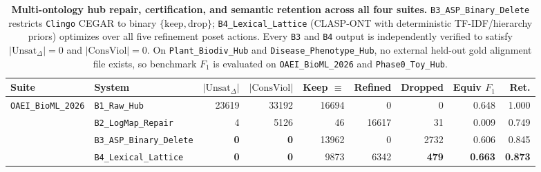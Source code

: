 \documentclass[10pt]{article}
\theoremstyle{accentdef}
\newcommand{\ClaspOAEIBioMLBRawHubUnsat}{23619}
\newcommand{\ClaspOAEIBioMLBRawHubConsViol}{33192}
\newcommand{\ClaspOAEIBioMLBRawHubRetention}{1.000}
\newcommand{\ClaspOAEIBioMLBRawHubEquivFone}{0.648}
\newcommand{\ClaspOAEIBioMLBRawHubKeepEquiv}{16694}
\newcommand{\ClaspOAEIBioMLBRawHubDropped}{0}
\newcommand{\ClaspOAEIBioMLBLogMapRepairUnsat}{4}
\newcommand{\ClaspOAEIBioMLBLogMapRepairConsViol}{5126}
\newcommand{\ClaspOAEIBioMLBLogMapRepairRetention}{0.749}
\newcommand{\ClaspOAEIBioMLBLogMapRepairEquivFone}{0.009}
\newcommand{\ClaspOAEIBioMLBLogMapRepairKeepEquiv}{46}
\newcommand{\ClaspOAEIBioMLBLogMapRepairDropped}{31}
\newcommand{\ClaspOAEIBioMLBASPBinaryDeleteUnsat}{0}
\newcommand{\ClaspOAEIBioMLBASPBinaryDeleteConsViol}{0}
\newcommand{\ClaspOAEIBioMLBASPBinaryDeleteRetention}{0.845}
\newcommand{\ClaspOAEIBioMLBASPBinaryDeleteEquivFone}{0.606}
\newcommand{\ClaspOAEIBioMLBASPBinaryDeleteKeepEquiv}{13962}
\newcommand{\ClaspOAEIBioMLBASPBinaryDeleteDropped}{2732}
\newcommand{\ClaspOAEIBioMLBLexicalLatticeUnsat}{0}
\newcommand{\ClaspOAEIBioMLBLexicalLatticeConsViol}{0}
\newcommand{\ClaspOAEIBioMLBLexicalLatticeRetention}{0.873}
\newcommand{\ClaspOAEIBioMLBLexicalLatticeEquivFone}{0.663}
\newcommand{\ClaspOAEIBioMLBLexicalLatticeKeepEquiv}{9873}
\newcommand{\ClaspOAEIBioMLBLexicalLatticeDropped}{479}
\begin{document}
\begin{table}[t]
\centering
\caption{\textbf{Multi-ontology hub repair, certification, and semantic retention across all four suites.} \texttt{B3\_ASP\_Binary\_Delete} restricts \texttt{Clingo} CEGAR to binary $\{\text{keep}, \text{drop}\}$; \texttt{B4\_Lexical\_Lattice} (\textsc{CLASP-ONT} with deterministic TF-IDF/hierarchy priors) optimizes over all five refinement poset actions. Every \texttt{B3} and \texttt{B4} output is independently verified to satisfy $|\mathrm{Unsat}_{\Delta}| = 0$ and $|\mathrm{ConsViol}| = 0$. On \texttt{Plant\_Biodiv\_Hub} and \texttt{Disease\_Phenotype\_Hub}, no external held-out gold alignment file exists, so benchmark $F_1$ is evaluated on \texttt{OAEI\_BioML\_2026} and \texttt{Phase0\_Toy\_Hub}.}
\label{tab:main_benchmark}
\footnotesize
\setlength{\tabcolsep}{4.2pt}
\begin{tabularx}{\textwidth}{@{}lXrrrrrrr@{}}
\toprule
\textbf{Suite} & \textbf{System} & $|\mathrm{Unsat}_{\Delta}|$ & $|\mathrm{ConsViol}|$ & \textbf{Keep $\equiv$} & \textbf{Refined} & \textbf{Dropped} & \textbf{Equiv $F_1$} & \textbf{Ret.} \\
\midrule
\multirow{4}{*}{\texttt{OAEI\_BioML\_2026}}
 & \texttt{B1\_Raw\_Hub} & \num{\ClaspOAEIBioMLBRawHubUnsat} & \num{\ClaspOAEIBioMLBRawHubConsViol} & \num{\ClaspOAEIBioMLBRawHubKeepEquiv} & 0 & \num{\ClaspOAEIBioMLBRawHubDropped} & \ClaspOAEIBioMLBRawHubEquivFone{} & \ClaspOAEIBioMLBRawHubRetention{} \\
 & \texttt{B2\_LogMap\_Repair} & \num{\ClaspOAEIBioMLBLogMapRepairUnsat} & \num{\ClaspOAEIBioMLBLogMapRepairConsViol} & \num{\ClaspOAEIBioMLBLogMapRepairKeepEquiv} & \num{16617} & \num{\ClaspOAEIBioMLBLogMapRepairDropped} & \ClaspOAEIBioMLBLogMapRepairEquivFone{} & \ClaspOAEIBioMLBLogMapRepairRetention{} \\
 & \texttt{B3\_ASP\_Binary\_Delete} & \textbf{\num{\ClaspOAEIBioMLBASPBinaryDeleteUnsat}} & \textbf{\num{\ClaspOAEIBioMLBASPBinaryDeleteConsViol}} & \num{\ClaspOAEIBioMLBASPBinaryDeleteKeepEquiv} & 0 & \num{\ClaspOAEIBioMLBASPBinaryDeleteDropped} & \ClaspOAEIBioMLBASPBinaryDeleteEquivFone{} & \ClaspOAEIBioMLBASPBinaryDeleteRetention{} \\
 & \texttt{B4\_Lexical\_Lattice} & \textbf{\num{\ClaspOAEIBioMLBLexicalLatticeUnsat}} & \textbf{\num{\ClaspOAEIBioMLBLexicalLatticeConsViol}} & \num{\ClaspOAEIBioMLBLexicalLatticeKeepEquiv} & \num{6342} & \textbf{\num{\ClaspOAEIBioMLBLexicalLatticeDropped}} & \textbf{\ClaspOAEIBioMLBLexicalLatticeEquivFone{}} & \textbf{\ClaspOAEIBioMLBLexicalLatticeRetention{}} \\

\end{tabularx}
\end{table}
\end{document}
